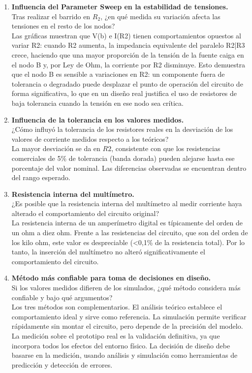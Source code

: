 \documentclass[12pt,a4paper]{article}
\begin{document}
\begin{enumerate}[leftmargin=*, label=\textbf{\arabic*.}]
    \item \textbf{Influencia del Parameter Sweep en la estabilidad de tensiones.}\\
    Tras realizar el barrido en $R_2$, ¿en qué medida su variación afecta
    las tensiones en el resto de los nodos?\\[4pt]
    Las gráficas muestran que V(b) e I(R2) tienen comportamientos opuestos al variar R2: cuando R2 aumenta, la impedancia equivalente del paralelo R2|R3 crece, haciendo que una mayor proporción de la tensión de la fuente caiga en el nodo B y, por Ley de Ohm, la corriente por R2 disminuye. Esto demuestra que el nodo B es sensible a variaciones en R2: un componente fuera de tolerancia o degradado puede desplazar el punto de operación del circuito de forma significativa, lo que en un diseño real justifica el uso de resistores de baja tolerancia cuando la tensión en ese nodo sea crítica.
 
    \item \textbf{Influencia de la tolerancia en los valores medidos.}\\
    ¿Cómo influyó la tolerancia de los resistores reales
    en la desviación de los valores de corriente medidos respecto a los teóricos?\\[4pt]
    La mayor desviación se da en $R2$, consistente con que los resistencias comerciales de 5\% de tolerancia (banda dorada)
    pueden alejarse hasta ese porcentaje del valor nominal. Las diferencias observadas se encuentran dentro del rango esperado.
 
    \item \textbf{Resistencia interna del multímetro.}\\
    ¿Es posible que la resistencia interna del multímetro al medir corriente
    haya alterado el comportamiento del circuito original?\\[4pt]
    La resistencia interna de un amperímetro digital es típicamente del orden de un ohm a diez ohm. Frente a las
    resistencias del circuito, que son del orden de los kilo ohm, este valor es despreciable (<0,1\% de la resistencia
    total). Por lo tanto, la inserción del multímetro no alteró significativamente el comportamiento del circuito.
 
    \item \textbf{Método más confiable para toma de decisiones en diseño.}\\
    Si los valores medidos difieren de los simulados, ¿qué método considera
    más confiable y bajo qué argumentos?\\[4pt]
    Los tres métodos son complementarios. El análisis teórico establece el comportamiento ideal y sirve como referencia.
    La simulación permite verificar rápidamente sin montar el circuito, pero depende de la precisión del modelo. La
    medición sobre el prototipo real es la validación definitiva, ya que incorpora todos los efectos del entorno físico.
    La decisión de diseño debe basarse en la medición, usando análisis y simulación como herramientas de predicción y
    detección de errores.
 

\end{enumerate}
\end{document}
